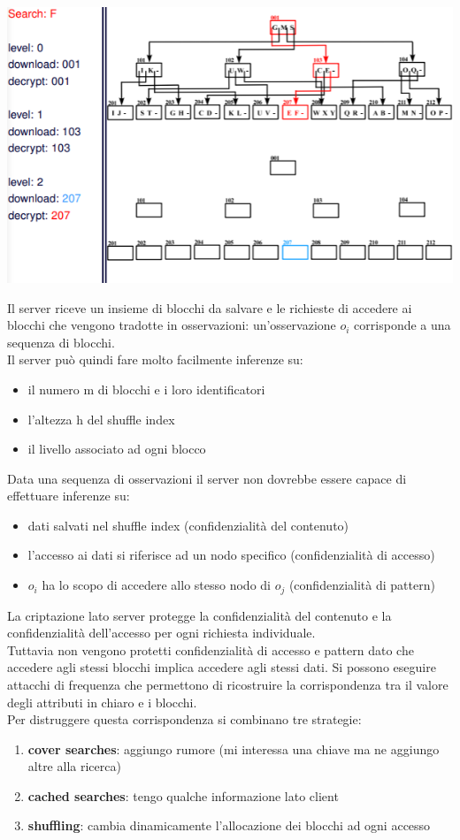 \begin{center}
    \includegraphics[scale=0.8]{img/shuffleaccess2.png}
\end{center}
Il server riceve un insieme di blocchi da salvare e le richieste di accedere ai blocchi che vengono tradotte in osservazioni: un'osservazione \(o_i\) corrisponde a una sequenza di blocchi.\\
Il server può quindi fare molto facilmente inferenze su:
\begin{itemize}
    \item il numero m di blocchi e i loro identificatori
    \item l'altezza h del shuffle index
    \item il livello associato ad ogni blocco
\end{itemize}
Data una sequenza di osservazioni il server non dovrebbe essere capace di effettuare inferenze su:
\begin{itemize}
    \item dati salvati nel shuffle index (confidenzialità del contenuto)
    \item l'accesso ai dati si riferisce ad un nodo specifico (confidenzialità di accesso)
    \item \(o_i\) ha lo scopo di accedere allo stesso nodo di \(o_j\) (confidenzialità di pattern)
\end{itemize}
La criptazione lato server protegge la confidenzialità del contenuto e la confidenzialità dell'accesso per ogni richiesta individuale. \\
Tuttavia non vengono protetti confidenzialità di accesso e pattern dato che accedere agli stessi blocchi implica accedere agli stessi dati. Si possono eseguire attacchi di frequenza che permettono di ricostruire la corrispondenza tra il valore degli attributi in chiaro e i blocchi.\\
Per distruggere questa corrispondenza si combinano tre strategie:
\begin{enumerate}
    \item \textbf{cover searches}: aggiungo rumore (mi interessa una chiave ma ne aggiungo altre alla ricerca)
    \item \textbf{cached searches}: tengo qualche informazione lato client
    \item \textbf{shuffling}: cambia dinamicamente l'allocazione dei blocchi ad ogni accesso
\end{enumerate}
